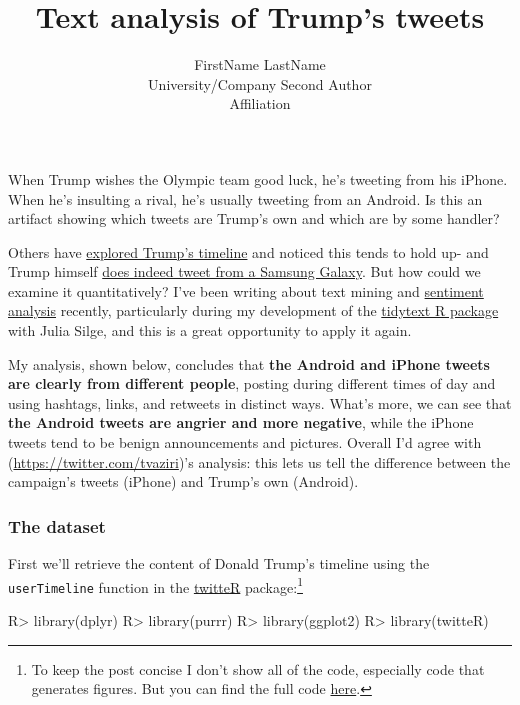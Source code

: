 \documentclass[
]{jss}
\author{
FirstName LastName\\University/Company \And Second Author\\Affiliation
}
\title{Text analysis of Trump's tweets \pkg{foo}}
\begin{document}
When Trump wishes the Olympic team good luck, he's tweeting from his
iPhone. When he's insulting a rival, he's usually tweeting from an
Android. Is this an artifact showing which tweets are Trump's own and
which are by some handler?

Others have
\href{http://www.cnet.com/news/trumps-tweets-android-for-nasty-iphone-for-nice/}{explored
Trump's timeline} and noticed this tends to hold up- and Trump himself
\href{http://www.theverge.com/2015/10/5/9453935/donald-trump-twitter-strategy}{does
indeed tweet from a Samsung Galaxy}. But how could we examine it
quantitatively? I've been writing about text mining and
\href{http://varianceexplained.org/r/yelp-sentiment/}{sentiment
analysis} recently, particularly during my development of the
\href{http://github.com/juliasilge/tidytext}{tidytext R package} with
Julia Silge, and this is a great opportunity to apply it again.

My analysis, shown below, concludes that \textbf{the Android and iPhone
tweets are clearly from different people}, posting during different
times of day and using hashtags, links, and retweets in distinct ways.
What's more, we can see that \textbf{the Android tweets are angrier and
more negative}, while the iPhone tweets tend to be benign announcements
and pictures. Overall I'd agree with
\citep{tvaziri}(\url{https://twitter.com/tvaziri})'s analysis: this lets
us tell the difference between the campaign's tweets (iPhone) and
Trump's own (Android).

\hypertarget{the-dataset}{%
\subsubsection{The dataset}\label{the-dataset}}

First we'll retrieve the content of Donald Trump's timeline using the
\texttt{userTimeline} function in the
\href{https://cran.r-project.org/web/packages/twitteR}{twitteR}
package:\footnote{To keep the post concise I don't show all of the code,
  especially code that generates figures. But you can find the full code
  \href{https://github.com/dgrtwo/dgrtwo.github.com/blob/master/_R/2016-08-09-trump-tweets.Rmd}{here}.}

\begin{CodeChunk}

\begin{CodeInput}
R> library(dplyr)
R> library(purrr)
R> library(ggplot2)
R> library(twitteR)
\end{CodeInput}
\end{CodeChunk}
\end{document}
